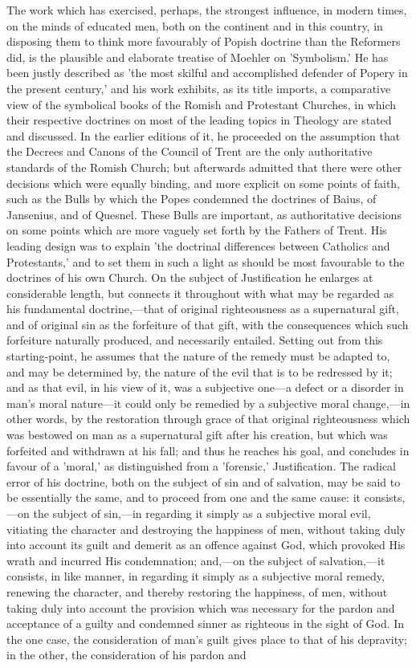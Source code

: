 \documentclass[
]{book}
\begin{document}
The work which has exercised, perhaps, the strongest influence, in modern times, on the minds of educated men, both on the continent and in this country, in disposing them to think more favourably of Popish doctrine than the Reformers did, is the plausible and elaborate treatise of Moehler on 'Symbolism.' He has been justly described as 'the most skilful and accomplished defender of Popery in the present century,' and his work exhibits, as its title imports, a comparative view of the symbolical books of the Romish and Protestant Churches, in which their respective doctrines on most of the leading topics in Theology are stated and discussed. In the earlier editions of it, he proceeded on the assumption that the Decrees and Canons of the Council of Trent are the only authoritative standards of the Romish Church; but afterwards admitted that there were other decisions which were equally binding, and more explicit on some points of faith, such as the Bulls by which the Popes condemned the doctrines of Baius, of Jansenius, and of Quesnel. These Bulls are important, as authoritative decisions on some points which are more vaguely set forth by the Fathers of Trent. His leading design was to explain 'the doctrinal differences between Catholics and Protestants,' and to set them in such a light as should be most favourable to the doctrines of his own Church. On the subject of Justification he enlarges at considerable length, but connects it throughout with what may be regarded as his fundamental doctrine,---that of original righteousness as a supernatural gift, and of original sin as the forfeiture of that gift, with the consequences which such forfeiture naturally produced, and necessarily entailed. Setting out from this starting-point, he assumes that the nature of the remedy must be adapted to, and may be determined by, the nature of the evil that is to be redressed by it; and as that evil, in his view of it, was a subjective one---a defect or a disorder in man's moral nature---it could only be remedied by a subjective moral change,---in other words, by the restoration through grace of that original righteousness which was bestowed on man as a supernatural gift after his creation, but which was forfeited and withdrawn at his fall; and thus he reaches his goal, and concludes in favour of a 'moral,' as distinguished from a 'forensic,' Justification. The radical error of his doctrine, both on the subject of sin and of salvation, may be said to be essentially the same, and to proceed from one and the same cause: it consists,---on the subject of sin,---in regarding it simply as a subjective moral evil, vitiating the character and destroying the happiness of men, without taking duly into account its guilt and demerit as an offence against God, which provoked His wrath and incurred His condemnation; and,---on the subject of salvation,---it consists, in like manner, in regarding it simply as a subjective moral remedy, renewing the character, and thereby restoring the happiness, of men, without taking duly into account the provision which was necessary for the pardon and acceptance of a guilty and condemned sinner as righteous in the sight of God. In the one case, the consideration of man's guilt gives place to that of his depravity; in the other, the consideration of his pardon and 
\end{document}
